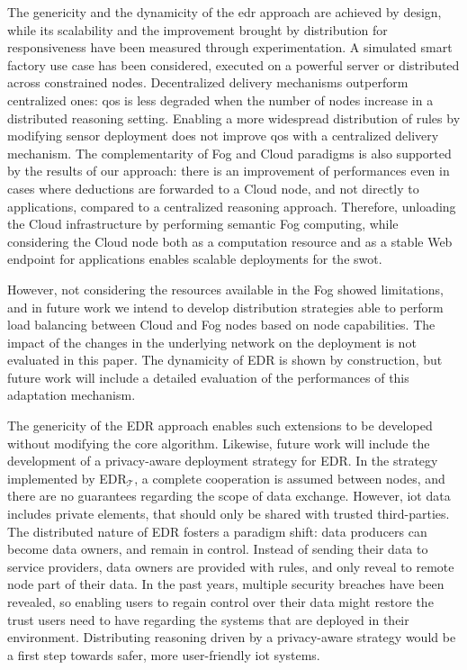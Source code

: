 \documentclass[sw]{iosart2x}
\newcommand{\edr}{EDR\xspace}
\newcommand{\edrt}{EDR$_{\mathcal{T}}$\xspace}
\begin{document}
The genericity and the dynamicity of the \gls{edr} approach are achieved by design, while its scalability and the improvement brought by distribution for responsiveness have been measured through experimentation.
A simulated smart factory use case has been considered, executed on a powerful server or distributed across constrained nodes.
Decentralized delivery mechanisms outperform centralized ones: \gls{qos} is less degraded when the number of nodes increase in a distributed reasoning setting.
Enabling a more widespread distribution of rules by modifying sensor deployment does not improve \gls{qos} with a centralized delivery mechanism.
The complementarity of Fog and Cloud paradigms is also supported by the results of our approach: there is an improvement of performances even in cases where deductions are forwarded to a Cloud node, and not directly to applications, compared to a centralized reasoning approach.
Therefore, unloading the Cloud infrastructure by performing semantic Fog computing, while considering the Cloud node both as a computation resource and as a stable Web endpoint for applications enables scalable deployments for the \gls{swot}.

However, not considering the resources available in the Fog showed limitations, and in future work we intend to develop distribution strategies able to perform load balancing between Cloud and Fog nodes based on node capabilities.
The impact of the changes in the underlying network on the deployment is not evaluated in this paper.
The dynamicity of \edr is shown by construction, but future work will include a detailed evaluation of the performances of this adaptation mechanism.

The genericity of the \edr approach enables such extensions to be developed without modifying the core algorithm.
Likewise, future work will include the development of a privacy-aware deployment strategy for \edr.
In the strategy implemented by \edrt, a complete cooperation is assumed between nodes, and there are no guarantees regarding the scope of data exchange.
However, \gls{iot} data includes private elements, that should only be shared with trusted third-parties.
The distributed nature of \edr fosters a paradigm shift: data producers can become data owners, and remain in control. 
Instead of sending their data to service providers, data owners are provided with rules, and only reveal to remote node part of their data.
In the past years, multiple security breaches have been revealed, so enabling users to regain control over their data might restore the trust users need to have regarding the systems that are deployed in their environment.
Distributing reasoning driven by a privacy-aware strategy would be a first step towards safer, more user-friendly \gls{iot} systems.
\end{document}
